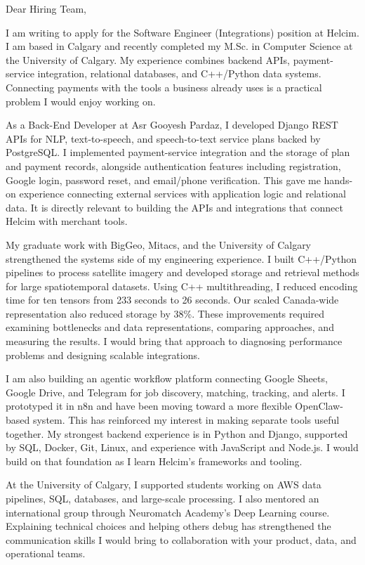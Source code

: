 \documentclass[11pt]{letter}
\begin{document}
\begin{letter}{}
\opening{Dear Hiring Team,}

I am writing to apply for the Software Engineer (Integrations) position at Helcim. I am based in Calgary and recently completed my M.Sc. in Computer Science at the University of Calgary. My experience combines backend APIs, payment-service integration, relational databases, and C++/Python data systems. Connecting payments with the tools a business already uses is a practical problem I would enjoy working on.

As a Back-End Developer at Asr Gooyesh Pardaz, I developed Django REST APIs for NLP, text-to-speech, and speech-to-text service plans backed by PostgreSQL. I implemented payment-service integration and the storage of plan and payment records, alongside authentication features including registration, Google login, password reset, and email/phone verification. This gave me hands-on experience connecting external services with application logic and relational data. It is directly relevant to building the APIs and integrations that connect Helcim with merchant tools.

My graduate work with BigGeo, Mitacs, and the University of Calgary strengthened the systems side of my engineering experience. I built C++/Python pipelines to process satellite imagery and developed storage and retrieval methods for large spatiotemporal datasets. Using C++ multithreading, I reduced encoding time for ten tensors from 233 seconds to 26 seconds. Our scaled Canada-wide representation also reduced storage by 38\%. These improvements required examining bottlenecks and data representations, comparing approaches, and measuring the results. I would bring that approach to diagnosing performance problems and designing scalable integrations.

I am also building an agentic workflow platform connecting Google Sheets, Google Drive, and Telegram for job discovery, matching, tracking, and alerts. I prototyped it in n8n and have been moving toward a more flexible OpenClaw-based system. This has reinforced my interest in making separate tools useful together. My strongest backend experience is in Python and Django, supported by SQL, Docker, Git, Linux, and experience with JavaScript and Node.js. I would build on that foundation as I learn Helcim's frameworks and tooling.

At the University of Calgary, I supported students working on AWS data pipelines, SQL, databases, and large-scale processing. I also mentored an international group through Neuromatch Academy's Deep Learning course. Explaining technical choices and helping others debug has strengthened the communication skills I would bring to collaboration with your product, data, and operational teams.


\end{letter}
\end{document}
